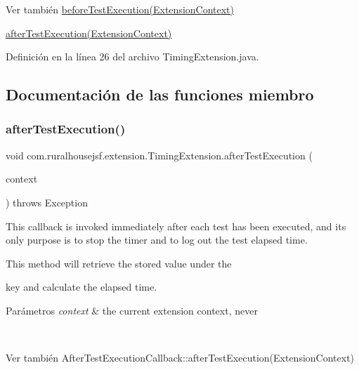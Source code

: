 \begin{DoxySeeAlso}{Ver también}
\mbox{\hyperlink{a00268_ad19d0a2513bd9041f9263c1d9536ed6c}{before\+Test\+Execution(\+Extension\+Context)}} 

\mbox{\hyperlink{a00268_a300725ce5f0290e9878185e05d84c019}{after\+Test\+Execution(\+Extension\+Context)}} 
\end{DoxySeeAlso}


Definición en la línea 26 del archivo Timing\+Extension.\+java.



\subsection{Documentación de las funciones miembro}
\mbox{\label{a00268_a300725ce5f0290e9878185e05d84c019}} 
\subsubsection{\texorpdfstring{afterTestExecution()}{afterTestExecution()}}
{\footnotesize\ttfamily void com.\+ruralhousejsf.\+extension.\+Timing\+Extension.\+after\+Test\+Execution (\begin{DoxyParamCaption}\item[{Extension\+Context}]{context }\end{DoxyParamCaption}) throws Exception}



This callback is invoked {\ttfamily immediately after} each test has been executed, and its only purpose is to stop the timer and to log out the test elapsed time. 

This method will retrieve the stored value under the
\begin{DoxyCode}{0}
\end{DoxyCode}


key and calculate the elapsed time.


\begin{DoxyParams}{Parámetros}
{\em context} & the current extension context, never
\begin{DoxyCode}{1}
\DoxyCodeLine{\textcolor{keyword}{null} }
\end{DoxyCode}
\\
\hline
\end{DoxyParams}
\begin{DoxySeeAlso}{Ver también}
After\+Test\+Execution\+Callback\+::after\+Test\+Execution(\+Extension\+Context) 
\end{DoxySeeAlso}


